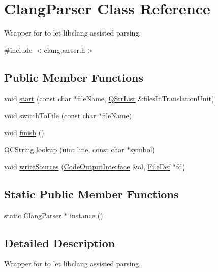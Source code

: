 \hypertarget{class_clang_parser}{}\section{Clang\+Parser Class Reference}
\label{class_clang_parser}


Wrapper for to let libclang assisted parsing.  




{\ttfamily \#include $<$clangparser.\+h$>$}

\subsection*{Public Member Functions}
\begin{DoxyCompactItemize}
\item 
void \mbox{\hyperlink{class_clang_parser_a6e336d45ecc4ec146bab1696fb26bd77}{start}} (const char $\ast$file\+Name, \mbox{\hyperlink{class_q_str_list}{Q\+Str\+List}} \&files\+In\+Translation\+Unit)
\item 
void \mbox{\hyperlink{class_clang_parser_a6b4d5e7994ee8d875f5f9bf67e8550e1}{switch\+To\+File}} (const char $\ast$file\+Name)
\item 
void \mbox{\hyperlink{class_clang_parser_ac7ccfd4ea36fc8c347e8f794109678c8}{finish}} ()
\item 
\mbox{\hyperlink{class_q_c_string}{Q\+C\+String}} \mbox{\hyperlink{class_clang_parser_a2617d0cd62525f13d53a896247ac75d6}{lookup}} (uint line, const char $\ast$symbol)
\item 
void \mbox{\hyperlink{class_clang_parser_a85070c801afbece678e44e5af2cf4c4b}{write\+Sources}} (\mbox{\hyperlink{class_code_output_interface}{Code\+Output\+Interface}} \&ol, \mbox{\hyperlink{class_file_def}{File\+Def}} $\ast$fd)
\end{DoxyCompactItemize}
\subsection*{Static Public Member Functions}
\begin{DoxyCompactItemize}
\item 
static \mbox{\hyperlink{class_clang_parser}{Clang\+Parser}} $\ast$ \mbox{\hyperlink{class_clang_parser_add1060dd5febd4664f6038a87d87b8cd}{instance}} ()
\end{DoxyCompactItemize}


\subsection{Detailed Description}
Wrapper for to let libclang assisted parsing. 

